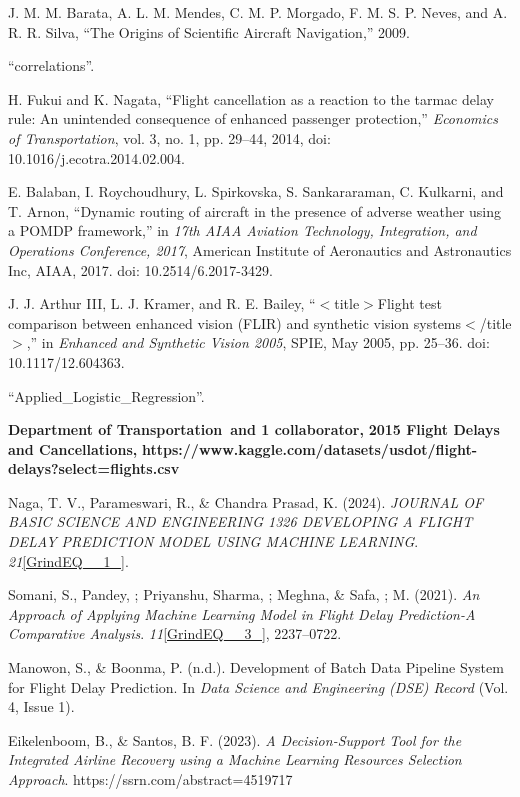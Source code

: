 \documentclass[conference]{IEEEtran}
\begin{document}
\noindent [11] J. M. M. Barata, A. L. M. Mendes, C. M. P. Morgado, F. M. S. P. Neves, and A. R. R. Silva, ``The Origins of Scientific Aircraft Navigation,'' 2009.

\noindent [12] ``correlations''.

\noindent [13] H. Fukui and K. Nagata, ``Flight cancellation as a reaction to the tarmac delay rule: An unintended consequence of enhanced passenger protection,'' \textit{Economics of Transportation}, vol. 3, no. 1, pp. 29--44, 2014, doi: 10.1016/j.ecotra.2014.02.004.

\noindent [14] E. Balaban, I. Roychoudhury, L. Spirkovska, S. Sankararaman, C. Kulkarni, and T. Arnon, ``Dynamic routing of aircraft in the presence of adverse weather using a POMDP framework,'' in \textit{17th AIAA Aviation Technology, Integration, and Operations Conference, 2017}, American Institute of Aeronautics and Astronautics Inc, AIAA, 2017. doi: 10.2514/6.2017-3429.

\noindent [15] J. J. Arthur III, L. J. Kramer, and R. E. Bailey, ``$\mathrm{<}$title$\mathrm{>}$Flight test comparison between enhanced vision (FLIR) and synthetic vision systems$\mathrm{<}$/title$\mathrm{>}$,'' in \textit{Enhanced and Synthetic Vision 2005}, SPIE, May 2005, pp. 25--36. doi: 10.1117/12.604363.

\noindent [16] ``Applied\_Logistic\_Regression''.

\noindent [17] \textbf{Department of Transportation~and 1 collaborator,} \textbf{2015 Flight Delays and Cancellations,} \textbf{https://www.kaggle.com/datasets/usdot/flight-delays?select=flights.csv}

\noindent [18]      Naga, T. V., Parameswari, R., \& Chandra Prasad, K. (2024). \textit{JOURNAL OF BASIC SCIENCE AND ENGINEERING 1326 DEVELOPING A FLIGHT DELAY PREDICTION MODEL USING MACHINE LEARNING}. \textit{21}\eqref{GrindEQ__1_}.

\noindent 

\noindent [19]   Somani, S., Pandey, ; Priyanshu, Sharma, ; Meghna, \& Safa, ; M. (2021). \textit{An Approach of Applying Machine Learning Model in Flight Delay Prediction-A Comparative Analysis}. \textit{11}\eqref{GrindEQ__3_}, 2237--0722.

\noindent [20] Manowon, S., \& Boonma, P. (n.d.). Development of Batch Data Pipeline System for Flight Delay Prediction. In \textit{Data Science and Engineering (DSE) Record} (Vol. 4, Issue 1).

\noindent [21]  Eikelenboom, B., \& Santos, B. F. (2023). \textit{A Decision-Support Tool for the Integrated Airline Recovery using a Machine Learning Resources Selection Approach}. https://ssrn.com/abstract=4519717
\end{document}

